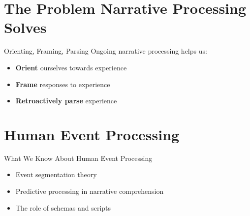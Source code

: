 \documentclass[aspectratio=169]{beamer}
\begin{document}
\section{The Problem Narrative Processing Solves}

\begin{frame}{Orienting, Framing, Parsing}
  Ongoing narrative processing helps us:
  
  \begin{itemize}
    \item<1-> \textbf{Orient} ourselves towards experience
    \item<2-> \textbf{Frame} responses to experience
    \item<3-> \textbf{Retroactively parse} experience
  \end{itemize}
  
  \vspace{1em}
\end{frame}

\section{Human Event Processing}

\begin{frame}{What We Know About Human Event Processing}
  
  \begin{itemize}
    \item Event segmentation theory
    \item Predictive processing in narrative comprehension
    \item The role of schemas and scripts
  \end{itemize}
  
\end{frame}

\end{document}

